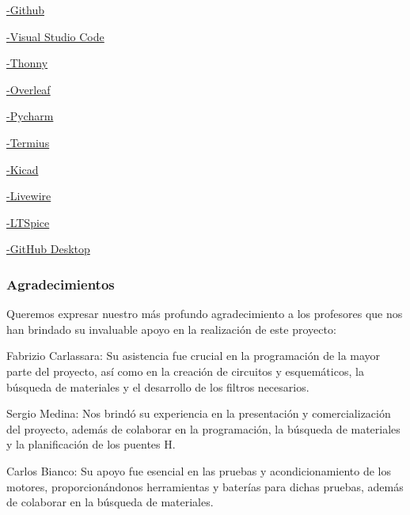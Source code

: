 \documentclass{article}
\begin{document}
    \href{https://github.com/}{-Github}    
    \newline

    \href{https://code.visualstudio.com/}{-Visual Studio Code}
    \newline

    \href{https://thonny.org/}{-Thonny}
    \newline

    \href{https://es.overleaf.com/project}{-Overleaf}
    \newline

    \href{https://www.jetbrains.com/es-es/pycharm/}{-Pycharm}
    \newline

    \href{https://termius.com/}{-Termius}
    \newline

    \href{https://www.kicad.org/}{-Kicad}
    \newline

    \href{https://livewire.laravel.com/}{-Livewire}
    \newline

    \href{https://www.analog.com/en/resources/design-tools-and-calculators/ltspice-simulator.html}{-LTSpice}
    \newline

    \href{https://github.com/apps/desktop}{-GitHub Desktop}

\subsubsection{Agradecimientos}

Queremos expresar nuestro más profundo agradecimiento a los profesores que nos han brindado su invaluable apoyo en la realización de este proyecto:


Fabrizio Carlassara: Su asistencia fue crucial en la programación de la mayor parte del proyecto, así como en la creación de circuitos y esquemáticos, la búsqueda de materiales y el desarrollo de los filtros necesarios.


Sergio Medina: Nos brindó su experiencia en la presentación y comercialización del proyecto, además de colaborar en la programación, la búsqueda de materiales y la planificación de los puentes H.


Carlos Bianco: Su apoyo fue esencial en las pruebas y acondicionamiento de los motores, proporcionándonos herramientas y baterías para dichas pruebas, además de colaborar en la búsqueda de materiales.
\end{document}
